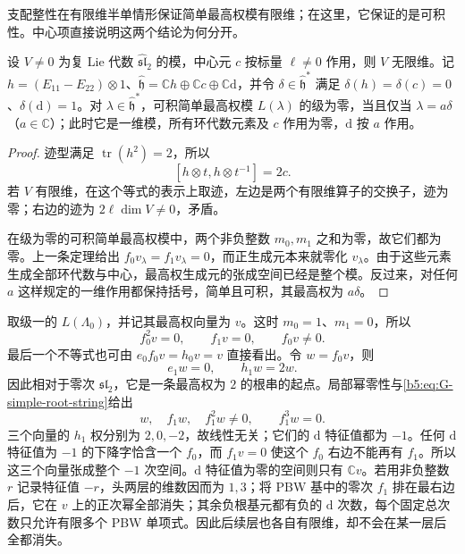 支配整性在有限维半单情形保证简单最高权模有限维；在这里，它保证的是可积性。中心项直接说明这两个结论为何分开。
\begin{proposition}\label{b5:prop:G-positive-level-infinite}
	设 \(V\ne0\) 为复 Lie 代数 \(\widehat{\mathfrak{sl}}_2\) 的模，中心元 \(c\) 按标量 \(\ell\ne0\) 作用，则 \(V\) 无限维。记 \(h=(E_{11}-E_{22})\otimes1\)、\(\widehat{\mathfrak h}=\mathbb Ch\oplus\mathbb Cc\oplus\mathbb C\mathrm d\)，并令 \(\delta\in\widehat{\mathfrak h}^*\) 满足 \(\delta(h)=\delta(c)=0\)、\(\delta(\mathrm d)=1\)。对 \(\lambda\in\widehat{\mathfrak h}^*\)，可积简单最高权模 \(L(\lambda)\) 的级为零，当且仅当 \(\lambda=a\delta\)（\(a\in\mathbb C\)）；此时它是一维模，所有环代数元素及 \(c\) 作用为零，\(\mathrm d\) 按 \(a\) 作用。
\end{proposition}
\begin{proof}
	迹型满足 \(\operatorname{tr}(h^2)=2\)，所以
	\[
		[h\otimes t,h\otimes t^{-1}]=2c.
	\]
	若 \(V\) 有限维，在这个等式的表示上取迹，左边是两个有限维算子的交换子，迹为零；右边的迹为 \(2\ell\dim V\ne0\)，矛盾。

	在级为零的可积简单最高权模中，两个非负整数 \(m_0,m_1\) 之和为零，故它们都为零。上一条定理给出 \(f_0v_\lambda=f_1v_\lambda=0\)，而正生成元本来就零化 \(v_\lambda\)。由于这些元素生成全部环代数与中心，最高权生成元的张成空间已经是整个模。反过来，对任何 \(a\) 这样规定的一维作用都保持括号，简单且可积，其最高权为 \(a\delta\)。
\end{proof}

取级一的 \(L(\Lambda_0)\)，并记其最高权向量为 \(v\)。这时 \(m_0=1\)、\(m_1=0\)，所以
\[
	f_0^2v=0,\qquad f_1v=0,\qquad f_0v\ne0.
\]
最后一个不等式也可由 \(e_0f_0v=h_0v=v\) 直接看出。令 \(w=f_0v\)，则
\[
	e_1w=0,\qquad h_1w=2w.
\]
因此相对于零次 \(\mathfrak{sl}_2\)，它是一条最高权为 \(2\) 的根串的起点。局部幂零性与\eqref{b5:eq:G-simple-root-string}给出
\[
	w,\quad f_1w,\quad f_1^2w\ne0,\qquad f_1^3w=0.
\]
三个向量的 \(h_1\) 权分别为 \(2,0,-2\)，故线性无关；它们的 \(\mathrm d\) 特征值都为 \(-1\)。任何 \(\mathrm d\) 特征值为 \(-1\) 的下降字恰含一个 \(f_0\)，而 \(f_1v=0\) 使这个 \(f_0\) 右边不能再有 \(f_1\)。所以这三个向量张成整个 \(-1\) 次空间。\(\mathrm d\) 特征值为零的空间则只有 \(\mathbb Cv\)。若用非负整数 \(r\) 记录特征值 \(-r\)，头两层的维数因而为 \(1,3\)；将 PBW 基中的零次 \(f_1\) 排在最右边后，它在 \(v\) 上的正次幂全部消失；其余负根基元都有负的 \(\mathrm d\) 次数，每个固定总次数只允许有限多个 PBW 单项式。因此后续层也各自有限维，却不会在某一层后全都消失。
